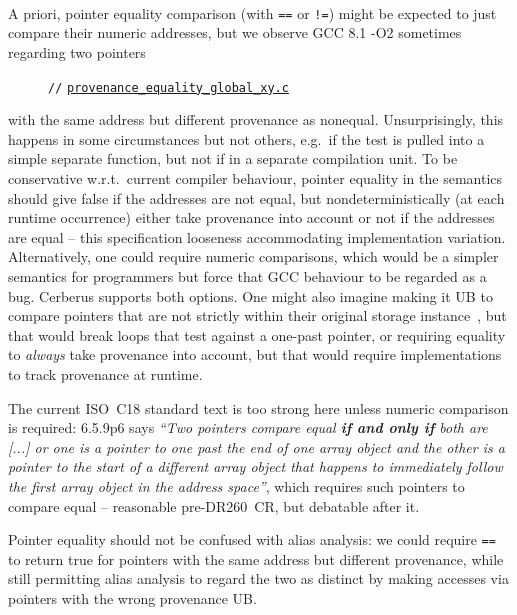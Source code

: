 \documentclass[acmsmall,review,screen]{acmart}\settopmatter{printfolios=true,printccs=false,printacmref=false}
\newcommand{\myparagraph}[1]{\vspace{0.5\baselineskip}\par\noindent{\normalsize\bfseries{#1}}\quad}
\newcommand{\mytesturl}[1]{https://cerberus.cl.cam.ac.uk/cerberus?defacto/#1}
\newcommand{\mytestlink}[2]{\href{\mytesturl{#1}}{#2}}
\newcommand{\mylsttestlink}[1]{\mytestlink{#1}{\lstinline{#1}}}
\newcommand{\mylistingmargin}{5mm}
\newcommand{\myfooexample}[3]{{\vspace*{-0.5\baselineskip}\par{\noindent\small\hspace*{\mylistingmargin}\lstinline{//} \mylsttestlink{#2}\vspace*{0.25\baselineskip}\par}}}
\begin{document}
\

\

\ 


\myparagraph{Pointer equality comparison and provenance}
%
A priori, pointer equality comparison (with \lstinline{==} or \lstinline{!=}) might be expected
to just compare their numeric addresses, but 
we observe GCC 8.1 -O2 sometimes
regarding two pointers
\begin{figure}
{\renewcommand{\mylistingmargin}{0mm}\myfooexample{charon_tests/}{provenance_equality_global_xy.c}{}%
}
\vspace*{-0\baselineskip}
\end{figure}
with the same address but different provenance
as nonequal. Unsurprisingly, this happens in
some circumstances but not others, e.g.~if the test is pulled into a
simple separate function, but not if in a separate compilation unit.
To be conservative w.r.t.~current compiler behaviour, pointer
equality in the semantics should give false if the addresses are not equal, but 
nondeterministically (at each runtime occurrence) either take provenance into
account or not if the addresses are equal -- this specification looseness accommodating 
implementation variation. 
Alternatively, one could require numeric comparisons, which would be a
simpler semantics for programmers but force that GCC behaviour to be regarded as a 
bug.  Cerberus supports both options.
One might also imagine making it UB to compare pointers that are not strictly within
their original storage instance~\cite{krebbers-phd}, but that would
break loops that test against a one-past pointer, or 
requiring equality to \emph{always} take provenance into account, but
that would require implementations to track provenance at runtime.

The current ISO~C18 standard text is too strong here unless numeric
comparison is required: 6.5.9p6 says \emph{``Two
pointers compare equal {\bfseries{}if and only if} both are [...] or one is a
pointer to one past the end of one array object and the other is a
pointer to the start of a different array object that happens to
immediately follow the first array object in the address space''},
which requires such pointers to compare equal -- reasonable pre-DR260~CR,
but debatable after it.

Pointer equality should not be confused with alias analysis: we could
require \lstinline{==} to return true for pointers with the same
address but different provenance, while still permitting alias
analysis to regard the two as distinct by making accesses via pointers
with the wrong provenance UB.
\end{document}
